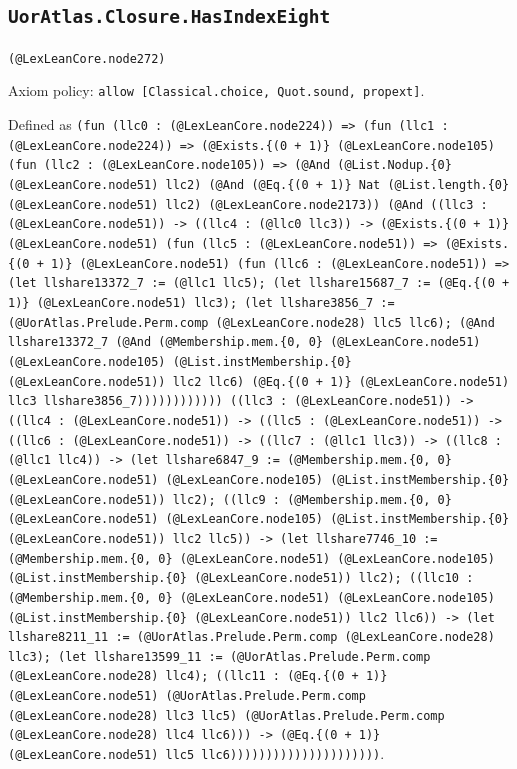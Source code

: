 \documentclass[11pt]{article}
\begin{document}
\subsection*{\texttt{UorAtlas.Closure.HasIndexEight}}
\noindent\texttt{(@LexLeanCore.node272)}\par
\noindent Axiom policy: \texttt{allow [Classical.choice, Quot.sound, propext]}.\par
\noindent Defined as \texttt{(fun (llc0 : (@LexLeanCore.node224)) => (fun (llc1 : (@LexLeanCore.node224)) => (@Exists.\{(0 + 1)\} (@LexLeanCore.node105) (fun (llc2 : (@LexLeanCore.node105)) => (@And (@List.Nodup.\{0\} (@LexLeanCore.node51) llc2) (@And (@Eq.\{(0 + 1)\} Nat (@List.length.\{0\} (@LexLeanCore.node51) llc2) (@LexLeanCore.node2173)) (@And ((llc3 : (@LexLeanCore.node51)) -> ((llc4 : (@llc0 llc3)) -> (@Exists.\{(0 + 1)\} (@LexLeanCore.node51) (fun (llc5 : (@LexLeanCore.node51)) => (@Exists.\{(0 + 1)\} (@LexLeanCore.node51) (fun (llc6 : (@LexLeanCore.node51)) => (let llshare13372\_7 := (@llc1 llc5); (let llshare15687\_7 := (@Eq.\{(0 + 1)\} (@LexLeanCore.node51) llc3); (let llshare3856\_7 := (@UorAtlas.Prelude.Perm.comp (@LexLeanCore.node28) llc5 llc6); (@And llshare13372\_7 (@And (@Membership.mem.\{0, 0\} (@LexLeanCore.node51) (@LexLeanCore.node105) (@List.instMembership.\{0\} (@LexLeanCore.node51)) llc2 llc6) (@Eq.\{(0 + 1)\} (@LexLeanCore.node51) llc3 llshare3856\_7)))))))))))) ((llc3 : (@LexLeanCore.node51)) -> ((llc4 : (@LexLeanCore.node51)) -> ((llc5 : (@LexLeanCore.node51)) -> ((llc6 : (@LexLeanCore.node51)) -> ((llc7 : (@llc1 llc3)) -> ((llc8 : (@llc1 llc4)) -> (let llshare6847\_9 := (@Membership.mem.\{0, 0\} (@LexLeanCore.node51) (@LexLeanCore.node105) (@List.instMembership.\{0\} (@LexLeanCore.node51)) llc2); ((llc9 : (@Membership.mem.\{0, 0\} (@LexLeanCore.node51) (@LexLeanCore.node105) (@List.instMembership.\{0\} (@LexLeanCore.node51)) llc2 llc5)) -> (let llshare7746\_10 := (@Membership.mem.\{0, 0\} (@LexLeanCore.node51) (@LexLeanCore.node105) (@List.instMembership.\{0\} (@LexLeanCore.node51)) llc2); ((llc10 : (@Membership.mem.\{0, 0\} (@LexLeanCore.node51) (@LexLeanCore.node105) (@List.instMembership.\{0\} (@LexLeanCore.node51)) llc2 llc6)) -> (let llshare8211\_11 := (@UorAtlas.Prelude.Perm.comp (@LexLeanCore.node28) llc3); (let llshare13599\_11 := (@UorAtlas.Prelude.Perm.comp (@LexLeanCore.node28) llc4); ((llc11 : (@Eq.\{(0 + 1)\} (@LexLeanCore.node51) (@UorAtlas.Prelude.Perm.comp (@LexLeanCore.node28) llc3 llc5) (@UorAtlas.Prelude.Perm.comp (@LexLeanCore.node28) llc4 llc6))) -> (@Eq.\{(0 + 1)\} (@LexLeanCore.node51) llc5 llc6)))))))))))))))))))))}.\par
\end{document}
